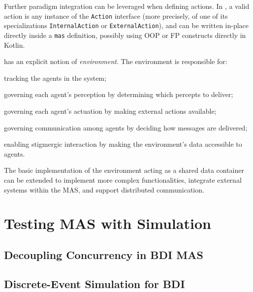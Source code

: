 Further paradigm integration can be leveraged when defining actions.
%
In \jakta{}, a valid action is any instance of the \texttt{Action} interface
(more precisely, of one of its specializations \texttt{InternalAction} or \texttt{ExternalAction}),
and can be written in-place directly inside a \texttt{mas} definition,
possibly using \ac{OOP} or \ac{FP} constructs directly in Kotlin.

\jakta{} has an explicit notion of \emph{environment}. The \jakta{} environment is responsible for:
%
\begin{inlinelist}
    \item tracking the agents in the system;
    \item governing each agent's perception by determining which percepts to deliver;
    \item governing each agent's actuation by making external actions available;
    \item governing communication among agents by deciding how messages are delivered;
    \item enabling stigmergic interaction by making the environment's data accessible to agents.
\end{inlinelist}
%
The basic implementation of the environment acting as a shared data container can be extended to implement more complex functionalities, integrate external systems within the \ac{MAS}, and support distributed communication. 


\section{Testing \acs{MAS} with Simulation}
\label{sec:mas:engineering:simulation}

\subsection{Decoupling Concurrency in BDI MAS}
\label{ssec:mas:engineering:concurrency}

\subsection{Discrete-Event Simulation for BDI}

